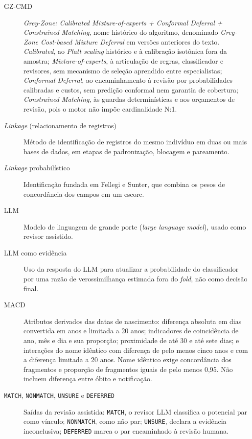 \begin{description}
\item[GZ-CMD] \textit{Grey-Zone: Calibrated Mixture-of-experts + Conformal Deferral + Constrained Matching}, nome histórico do algoritmo, denominado \textit{Grey-Zone Cost-based Mixture Deferral} em versões anteriores do texto. \textit{Calibrated}, ao \textit{Platt scaling} histórico e à calibração isotônica fora da amostra; \textit{Mixture-of-experts}, à articulação de regras, classificador e revisores, sem mecanismo de seleção aprendido entre especialistas; \textit{Conformal Deferral}, ao encaminhamento à revisão por probabilidades calibradas e custos, sem predição conformal nem garantia de cobertura; \textit{Constrained Matching}, às guardas determinísticas e aos orçamentos de revisão, pois o motor não impõe cardinalidade N:1.

\item[\textit{Linkage} (relacionamento de registros)] Método de identificação de registros do mesmo indivíduo em duas ou mais bases de dados, em etapas de padronização, blocagem e pareamento.

\item[\textit{Linkage} probabilístico] Identificação fundada em Fellegi e Sunter, que combina os pesos de concordância dos campos em um escore.

\item[LLM] Modelo de linguagem de grande porte (\textit{large language model}), usado como revisor assistido.

\item[LLM como evidência] Uso da resposta do LLM para atualizar a probabilidade do classificador por uma razão de verossimilhança estimada fora do \textit{fold}, não como decisão final.

\item[MACD] Atributos derivados das datas de nascimento: diferença absoluta em dias convertida em anos e limitada a 20 anos; indicadores de coincidência de ano, mês e dia e sua proporção; proximidade de até 30 e até sete dias; e interações do nome idêntico com diferença de pelo menos cinco anos e com a diferença limitada a 20 anos. Nome idêntico exige concordância dos fragmentos e proporção de fragmentos iguais de pelo menos 0,95. Não incluem diferença entre óbito e notificação.

\item[\texttt{MATCH}, \texttt{NONMATCH}, \texttt{UNSURE} e \texttt{DEFERRED}] Saídas da revisão assistida: \texttt{MATCH}, o revisor LLM classifica o potencial par como vínculo; \texttt{NONMATCH}, como não par; \texttt{UNSURE}, declara a evidência inconclusiva; \texttt{DEFERRED} marca o par encaminhado à revisão humana.


\end{description}
